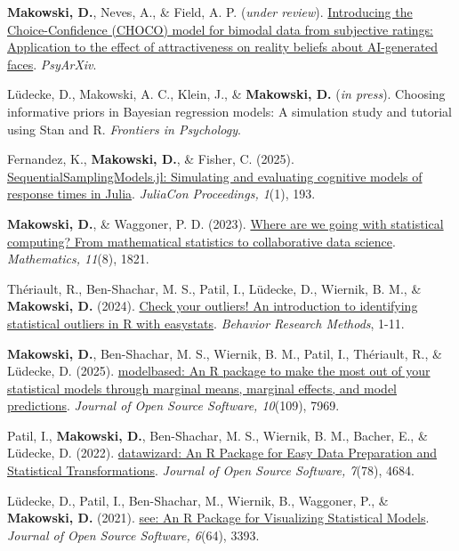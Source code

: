 \documentclass[11pt,a4paper,]{awesome-cv}
\begin{document}
\scriptsize

\textbf{Makowski, D.}, Neves, A., \& Field, A. P. (\emph{under review}).
\href{https://osf.io/preprints/psyarxiv/placeholder}{Introducing the
Choice-Confidence (CHOCO) model for bimodal data from subjective
ratings: Application to the effect of attractiveness on reality beliefs
about AI-generated faces}. \emph{PsyArXiv}.

Lüdecke, D., Makowski, A. C., Klein, J., \& \textbf{Makowski, D.}
(\emph{in press}). Choosing informative priors in Bayesian regression
models: A simulation study and tutorial using Stan and R.
\emph{Frontiers in Psychology}.

Fernandez, K., \textbf{Makowski, D.}, \& Fisher, C. (2025).
\href{https://doi.org/10.21105/jcon.00193}{SequentialSamplingModels.jl:
Simulating and evaluating cognitive models of response times in Julia}.
\emph{JuliaCon Proceedings, 1}(1), 193.

\textbf{Makowski, D.}, \& Waggoner, P. D. (2023).
\href{https://www.mdpi.com/2227-7390/11/8/1821}{Where are we going with
statistical computing? From mathematical statistics to collaborative
data science}. \emph{Mathematics, 11}(8), 1821.

Thériault, R., Ben-Shachar, M. S., Patil, I., Lüdecke, D., Wiernik, B.
M., \& \textbf{Makowski, D.} (2024).
\href{https://link.springer.com/article/10.3758/s13428-024-02356-w}{Check
your outliers! An introduction to identifying statistical outliers in R
with easystats}. \emph{Behavior Research Methods}, 1-11.

\textbf{Makowski, D.}, Ben-Shachar, M. S., Wiernik, B. M., Patil, I.,
Thériault, R., \& Lüdecke, D. (2025).
\href{https://doi.org/10.21105/joss.07969}{modelbased: An R package to
make the most out of your statistical models through marginal means,
marginal effects, and model predictions}. \emph{Journal of Open Source
Software, 10}(109), 7969.

Patil, I., \textbf{Makowski, D.}, Ben-Shachar, M. S., Wiernik, B. M.,
Bacher, E., \& Lüdecke, D. (2022).
\href{https://joss.theoj.org/papers/10.21105/joss.04684}{datawizard: An
R Package for Easy Data Preparation and Statistical Transformations}.
\emph{Journal of Open Source Software, 7}(78), 4684.

Lüdecke, D., Patil, I., Ben-Shachar, M., Wiernik, B., Waggoner, P., \&
\textbf{Makowski, D.} (2021).
\href{https://joss.theoj.org/papers/10.21105/joss.03393}{see: An R
Package for Visualizing Statistical Models}. \emph{Journal of Open
Source Software, 6}(64), 3393.
\end{document}
